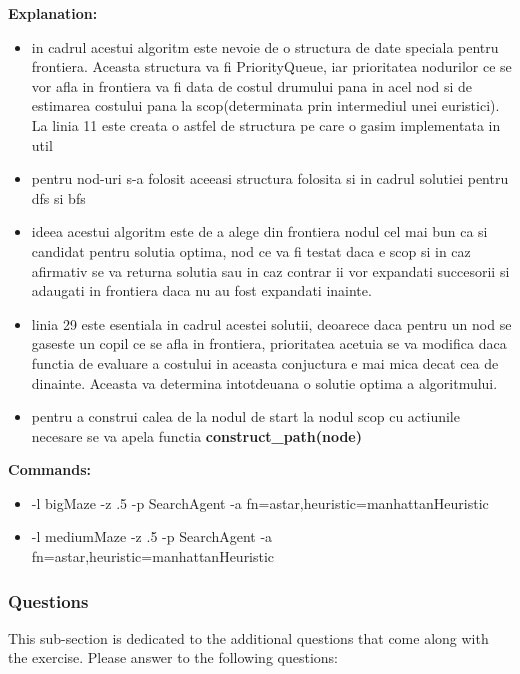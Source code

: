 \textbf{Explanation:}
\begin{itemize}
    \setlength\itemsep{0em}
    \item in cadrul acestui algoritm este nevoie de o structura de date speciala pentru frontiera. Aceasta structura va fi PriorityQueue, iar prioritatea nodurilor ce se vor afla in frontiera va fi data de costul drumului pana in acel nod si de estimarea costului pana la scop(determinata prin intermediul unei euristici). La linia 11 este creata o astfel de structura pe care o gasim implementata in util
    \item pentru nod-uri s-a folosit aceeasi structura folosita si in cadrul solutiei pentru dfs si bfs
    \item ideea acestui algoritm este de a alege din frontiera nodul cel mai bun ca si candidat pentru solutia optima, nod ce va fi testat daca e scop si in caz afirmativ se va returna solutia sau in caz contrar ii vor expandati succesorii si adaugati in frontiera daca nu au fost expandati inainte. 
    \item linia 29 este esentiala in cadrul acestei solutii, deoarece daca pentru un nod se gaseste un copil ce se afla in frontiera, prioritatea acetuia se va modifica daca functia de evaluare a costului in aceasta conjuctura e mai mica decat cea de dinainte. Aceasta va determina intotdeuana o solutie optima a algoritmului. 
    \item pentru a construi calea de la nodul de start la nodul scop cu actiunile necesare se va apela functia \textbf{construct\_path(node)}

\end{itemize}


\textbf{Commands:}
\begin{itemize}
    \setlength\itemsep{0em}
    \item  -l bigMaze -z .5 -p SearchAgent -a fn=astar,heuristic=manhattanHeuristic
    \item  -l mediumMaze -z .5 -p SearchAgent -a fn=astar,heuristic=manhattanHeuristic
        
\end{itemize}

\subsubsection{Questions}
This sub-section is dedicated to the additional questions that come along with the exercise. Please answer to the following questions:\newline


